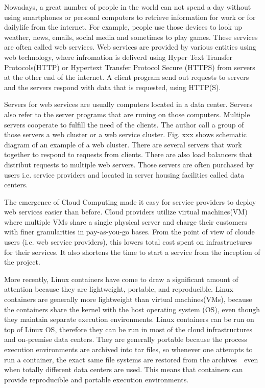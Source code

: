 
Nowadays, a great number of people in the world can not spend a day without using smartphones or personal computers to retrieve information for work or for dailylife from the internet.
For example, people use those devices to look up weather, news, emails, social media and sometimes to play games.
These services are often called web services.
Web services are provided by various entities using web technology, where infromation is deliverd using Hyper Text Transfer Protocols(HTTP) or Hypertext Transfer Protocol Secure (HTTPS) from servers at the other end of the internet.
A client program send out requests to servers and the servers respond with data that is requested, using HTTP(S). 

Servers for web services are usually computers located in a data center.
Servers also refer to the server programs that are runing on those computers. 
Multiple servers cooperate to fulfill the need of the clients.
The author call a group of those servers a web cluster or a web service cluster.
Fig. xxx shows schematic diagram of an example of a web cluster.
There are several servers that work together to respond to requests from clients.
There are also load balancers that distribut requests to multiple web servers.
Those servers are often purchased by users i.e. service providers and located in server housing facilities called data centers.

The emergence of Cloud Computing made it easy for service providers to deploy web services easier than before.
Cloud providers utilize virtual machines(VM) where multiple VMs share a single physical server  and charge their customers with finer granularities in pay-as-you-go bases.
From the point of view of cloude users (i.e. web service providers), this lowers total cost spent on infrastructures for their services.
It also shortens the time to start a service from the inception of the project.  

More recently, Linux containers\cite{menage2007adding} have come to draw a significant amount of attention because they are lightweight, portable, and reproducible.
Linux containers are generally more lightweight than virtual machines(VMs), because the containers share the kernel with the host operating system (OS), even though they maintain separate execution environments.
Linux containers can be run on top of Linux OS, therefore they can be run in most of the cloud infrastructures and on-premise data centers. 
They are generally portable because the process execution environments are archived into tar files,
so whenever one attempts to run a container, the exact same file systems are restored from the archives　even when totally different data centers are used.
This means that containers can provide reproducible and portable execution environments.

